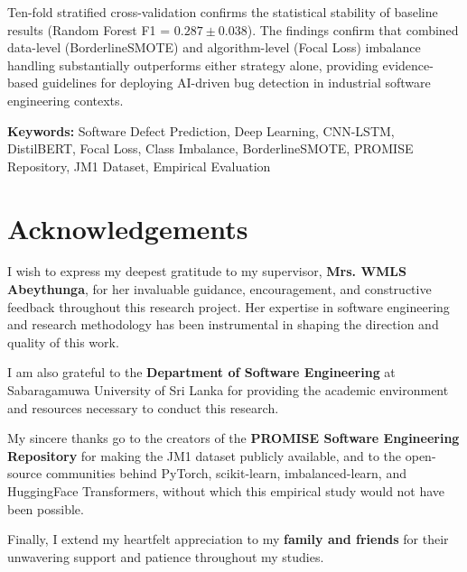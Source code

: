\documentclass[12pt,a4paper,oneside]{report}
\begin{document}
Ten-fold stratified cross-validation confirms the statistical stability of baseline results (Random Forest F1 = $0.287 \pm 0.038$). The findings confirm that combined data-level (BorderlineSMOTE) and algorithm-level (Focal Loss) imbalance handling substantially outperforms either strategy alone, providing evidence-based guidelines for deploying AI-driven bug detection in industrial software engineering contexts.

\vspace{8mm}
\noindent\textbf{Keywords:} Software Defect Prediction, Deep Learning, CNN-LSTM, DistilBERT, Focal Loss, Class Imbalance, BorderlineSMOTE, PROMISE Repository, JM1 Dataset, Empirical Evaluation

\clearpage

\chapter*{Acknowledgements}

I wish to express my deepest gratitude to my supervisor, \textbf{Mrs. WMLS Abeythunga}, for her invaluable guidance, encouragement, and constructive feedback throughout this research project. Her expertise in software engineering and research methodology has been instrumental in shaping the direction and quality of this work.

I am also grateful to the \textbf{Department of Software Engineering} at Sabaragamuwa University of Sri Lanka for providing the academic environment and resources necessary to conduct this research.

My sincere thanks go to the creators of the \textbf{PROMISE Software Engineering Repository} for making the JM1 dataset publicly available, and to the open-source communities behind PyTorch, scikit-learn, imbalanced-learn, and HuggingFace Transformers, without which this empirical study would not have been possible.

Finally, I extend my heartfelt appreciation to my \textbf{family and friends} for their unwavering support and patience throughout my studies.

\clearpage

\tableofcontents
\clearpage

\listoffigures
{}
\clearpage
\end{document}

